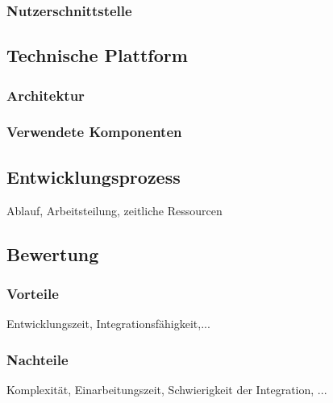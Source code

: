 \documentclass[11pt,a4paper,ngerman]{book}
\begin{document}
\subsubsection{Nutzerschnittstelle}

\subsection{Technische Plattform}
\subsubsection{Architektur}
\subsubsection{Verwendete Komponenten}

\subsection{Entwicklungsprozess}
Ablauf, Arbeitsteilung, zeitliche Ressourcen

\subsection{Bewertung}
\subsubsection{Vorteile}
Entwicklungszeit, Integrationsfähigkeit,...
\subsubsection{Nachteile}
Komplexität, Einarbeitungszeit, Schwierigkeit der Integration, ...
\end{document}
